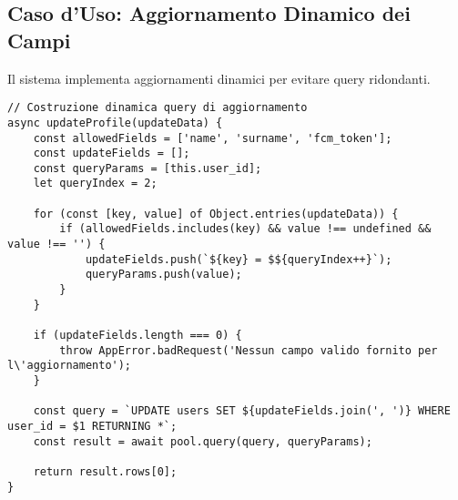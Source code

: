 \newpage

\subsection{Caso d'Uso: Aggiornamento Dinamico dei Campi}

Il sistema implementa aggiornamenti dinamici per evitare query ridondanti.

\begin{lstlisting}[caption=Update Dinamico Utente (User.js)]
// Costruzione dinamica query di aggiornamento
async updateProfile(updateData) {
    const allowedFields = ['name', 'surname', 'fcm_token'];
    const updateFields = [];
    const queryParams = [this.user_id];
    let queryIndex = 2;

    for (const [key, value] of Object.entries(updateData)) {
        if (allowedFields.includes(key) && value !== undefined && value !== '') {
            updateFields.push(`${key} = $${queryIndex++}`);
            queryParams.push(value);
        }
    }

    if (updateFields.length === 0) {
        throw AppError.badRequest('Nessun campo valido fornito per l\'aggiornamento');
    }

    const query = `UPDATE users SET ${updateFields.join(', ')} WHERE user_id = $1 RETURNING *`;
    const result = await pool.query(query, queryParams);
    
    return result.rows[0];
}
\end{lstlisting}